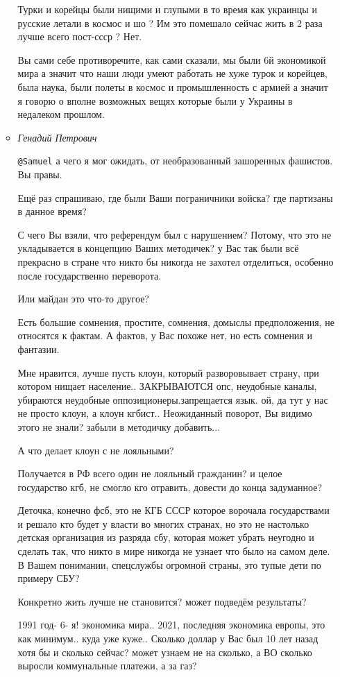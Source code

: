 \begin{itemize}
\begin{itemize}
Турки и корейцы были нищими и глупыми в то время как украинцы и русские летали
в космос и шо ? Им это помешало сейчас жить в 2 раза лучше всего пост-ссср ?
Нет.

Вы сами себе противоречите, как сами сказали, мы были 6й экономикой мира а
значит что наши люди умеют работать не хуже турок и корейцев, была наука, были
полеты в космос и промышленность с армией а значит я говорю о вполне возможных
вещях которые были у Украины в недалеком прошлом.


\item \emph{Генадий Петрович}

\verb|@Samuel|  а чего я мог ожидать, от необразованный зашоренных фашистов. Вы правы.

Ещё раз спрашиваю, где были Ваши пограничники войска? где партизаны в данное время?

С чего Вы взяли, что референдум был с нарушением? Потому, что это не
укладывается в концепцию Ваших методичек? у Вас так были всё прекрасно в
стране что никто бы никогда не захотел отделиться, особенно после
государственно переворота.

Или майдан это что-то другое?

Есть большие сомнения, простите, сомнения, домыслы предположения, не относятся
к фактам. А фактов, у Вас похоже нет, но есть сомнения и фантазии.

Мне нравится, лучше пусть клоун, который разворовывает страну, при котором
нищает население.. ЗАКРЫВАЮТСЯ опс, неудобные каналы, убираются неудобные
оппозиционеры.запрещается язык. ой, да тут у нас не просто клоун, а клоун
кгбист.. Неожиданный поворот, Вы видимо этого не знали? забыли в методичку
добавить...

А что делает клоун с не лояльными?

Получается в РФ всего один не лояльный гражданин? и целое государство кгб, не
смогло кго отравить, довести до конца задуманное? 

Деточка, конечно фсб, это не КГБ СССР которое ворочала государствами и решало
кто будет у власти во многих странах, но это не настолько детская организация
из разряда сбу, которая может убрать неугодно и сделать так, что никто в мире
никогда не узнает что было на самом деле. В Вашем понимании, спецслужбы
огромной страны, это тупые дети по примеру СБУ?

Конкретно жить лучше не становится? может подведём результаты?

1991 год- 6- я! экономика мира.. 2021, последняя экономика европы, это как
минимум.. куда уже куже.. Сколько доллар у Вас был 10 лет назад хотя бы и
сколько сейчас? может узнаем не на сколько, а ВО сколько выросли коммунальные
платежи, а за газ?


\end{itemize}
\end{itemize}
